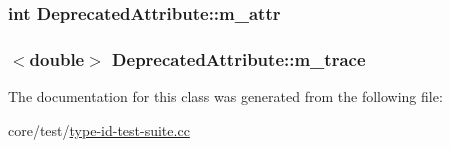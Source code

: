 \subsubsection[{\texorpdfstring{m\+\_\+attr}{m_attr}}]{\setlength{\rightskip}{0pt plus 5cm}int Deprecated\+Attribute\+::m\+\_\+attr\hspace{0.3cm}{\ttfamily [private]}}\hypertarget{classDeprecatedAttribute_a7037b9439000c89a1447139730ac6aa9}{}\label{classDeprecatedAttribute_a7037b9439000c89a1447139730ac6aa9}
\subsubsection[{\texorpdfstring{m\+\_\+trace}{m_trace}}]{$<$double$>$ Deprecated\+Attribute\+::m\+\_\+trace\hspace{0.3cm}{\ttfamily [private]}}\hypertarget{classDeprecatedAttribute_ac6092d8f46c3ca12f4a535c850a6ef55}{}\label{classDeprecatedAttribute_ac6092d8f46c3ca12f4a535c850a6ef55}


The documentation for this class was generated from the following file\+:\begin{DoxyCompactItemize}
\item 
core/test/\hyperlink{type-id-test-suite_8cc}{type-\/id-\/test-\/suite.\+cc}\end{DoxyCompactItemize}
